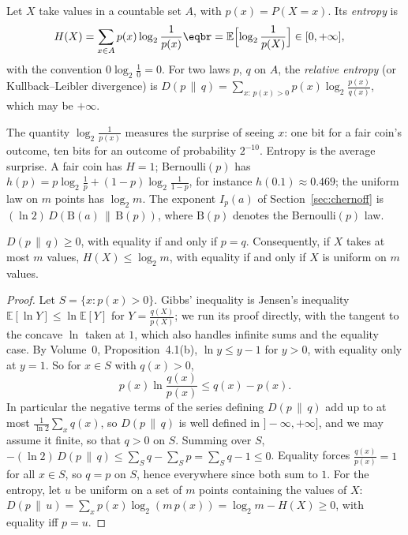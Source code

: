 \begin{definition}
Let $X$ take values in a countable set $A$, with $p(x)=P(X=x)$. Its \emph{entropy} is
\[
\begin{aligned}H(X)&=\sum_{x\in A}p(x)\log_2\frac1{p(x)}\eqbr=\mathbb E\Bigl[\log_2\frac1{p(X)}\Bigr]\in[0,+\infty],\end{aligned}
\]
with the convention $0\log_2\frac10=0$. For two laws $p$, $q$ on $A$, the \emph{relative entropy} (or Kullback--Leibler divergence)
is $D(p\,\|\,q)=\sum_{x:\,p(x)>0}p(x)\log_2\frac{p(x)}{q(x)}$, which may be $+\infty$.
\end{definition}

The quantity $\log_2\frac1{p(x)}$ measures the surprise of seeing $x$: one bit for a fair coin's outcome, ten bits for
an outcome of probability $2^{-10}$. Entropy is the average surprise. A fair coin has $H=1$; Bernoulli$(p)$ has
$h(p)=p\log_2\frac1p+(1-p)\log_2\frac1{1-p}$, for instance $h(0.1)\approx0.469$; the uniform law on $m$ points has $\log_2m$. The exponent $I_p(a)$ of
Section~\ref{sec:chernoff} is $(\ln2)\,D(\mathrm{B}(a)\,\|\,\mathrm{B}(p))$, where $\mathrm{B}(p)$ denotes the Bernoulli$(p)$ law.

\begin{proposition}\label{prop:gibbs}
$D(p\,\|\,q)\ge0$, with equality if and only if $p=q$. Consequently, if $X$ takes at most $m$ values, $H(X)\le\log_2m$, with
equality if and only if $X$ is uniform on $m$ values.
\end{proposition}
\begin{proof}
Let $S=\{x:p(x)>0\}$. Gibbs' inequality is Jensen's inequality $\mathbb E[\ln Y]\le\ln\mathbb E[Y]$ for $Y=\frac{q(X)}{p(X)}$; we run its proof directly, with the
tangent to the concave $\ln$ taken at $1$, which also handles infinite sums and the equality case. By Volume~0,
Proposition~4.1(b), $\ln y\le y-1$ for $y>0$, with equality only at $y=1$. So for $x\in S$ with $q(x)>0$,
\[
p(x)\ln\frac{q(x)}{p(x)}\le q(x)-p(x).
\]
In particular the negative terms of the series defining $D(p\,\|\,q)$ add up to at most $\frac1{\ln2}\sum_xq(x)$, so $D(p\,\|\,q)$ is well defined in
$]-\infty,+\infty]$, and we may assume it finite, so that $q>0$ on $S$. Summing over $S$,
$-(\ln2)\,D(p\,\|\,q)\le\sum_Sq-\sum_Sp=\sum_Sq-1\le0$. Equality forces $\frac{q(x)}{p(x)}=1$ for all $x\in S$, so $q=p$ on $S$, hence everywhere since
both sum to $1$. For the entropy, let $u$ be uniform on a set of $m$ points containing the values of
$X$: $D(p\,\|\,u)=\sum_xp(x)\log_2(m\,p(x))=\log_2m-H(X)\ge0$, with equality iff $p=u$.
\end{proof}

